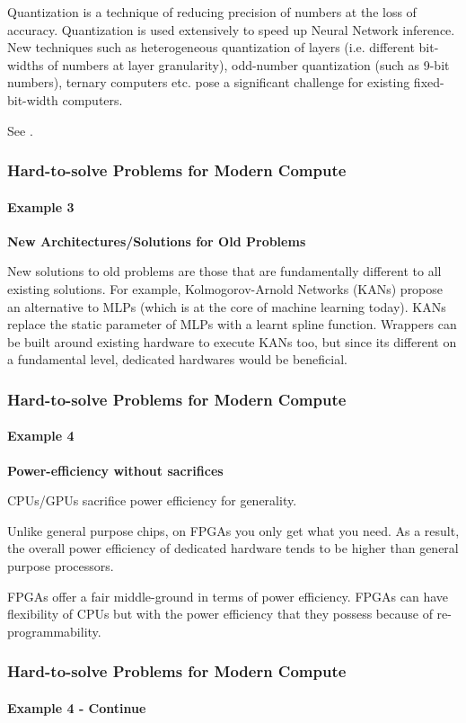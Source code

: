 \documentclass{beamer}
\begin{document}
{\begin{frame}[fragile]
  Quantization is a technique of reducing precision of numbers at the loss of
  accuracy. Quantization is used extensively to speed up Neural Network
  inference. New techniques such as heterogeneous quantization of layers (i.e.
  different bit-widths of numbers at layer granularity), odd-number quantization
  (such as 9-bit numbers), ternary computers etc. pose a significant challenge
  for existing fixed-bit-width computers. 

  See \cite{coelho21}.

\end{frame}

\begin{frame}[fragile]
  \frametitle{Hard-to-solve Problems for Modern Compute}
  \framesubtitle{Example 3}
  \textbf{New Architectures/Solutions for Old Problems}

  New solutions to old problems are those that are fundamentally different to
  all existing solutions. For example, Kolmogorov-Arnold Networks (KANs) propose
  an alternative to MLPs (which is at the core of machine learning today). KANs
  replace the static parameter of MLPs with a learnt spline function. Wrappers
  can be built around existing hardware to execute KANs too, but since its
  different on a fundamental level, dedicated hardwares would be beneficial.

\end{frame}

\begin{frame}[fragile]
  \frametitle{Hard-to-solve Problems for Modern Compute}
  \framesubtitle{Example 4}

  \textbf{Power-efficiency without sacrifices}

  CPUs/GPUs sacrifice power efficiency for generality. 

  Unlike general purpose chips, on FPGAs you only get what you need. As a
  result, the overall power efficiency of dedicated hardware tends to be
  higher than general purpose processors. 

  FPGAs offer a fair middle-ground in terms of power efficiency. FPGAs
  can have flexibility of CPUs but with the power efficiency that they possess
  because of re-programmability.

\end{frame}

\begin{frame}[fragile]
  \frametitle{Hard-to-solve Problems for Modern Compute}
  \framesubtitle{Example 4 - Continue}


\end{frame}}
\end{document}
